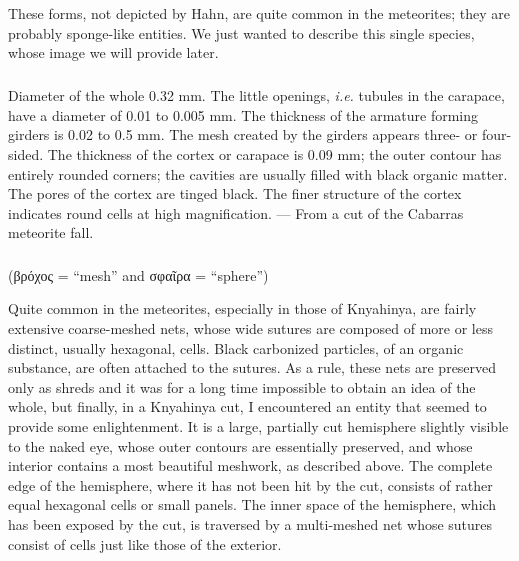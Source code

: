 \documentclass[a4paper, 12pt, oneside]{article}
\begin{document}
These forms, not depicted by Hahn, are quite common in the meteorites; they are probably sponge-like entities. We just wanted to describe this single species, whose image we will provide later.
\paragraph{\large{}}
\subparagraph{}
Diameter of the whole 0.32 mm. The little openings, \emph{i.e.} tubules in the carapace, have a diameter of 0.01 to 0.005 mm. The thickness of the armature forming girders is 0.02 to 0.5 mm. The mesh created by the girders appears three- or four-sided. The thickness of the cortex or carapace is 0.09 mm; the outer contour has entirely rounded corners; the cavities are usually filled with black organic matter. The pores of the cortex are tinged black. The finer structure of the cortex indicates round cells at high magnification. --- From a cut of the Cabarras meteorite fall.
\subsubsection{}
\paragraph*{}
(βρόχος = ``mesh'' and σφαῖρα = ``sphere'')%

Quite common in the meteorites, especially in those of Knyahinya, are fairly extensive coarse-meshed nets, whose wide sutures are composed of more or less distinct, usually hexagonal, cells. Black carbonized particles, of an organic substance, are often attached to the sutures. As a rule, these nets are preserved only as shreds and it was for a long time impossible to obtain an idea of the whole, but finally, in a Knyahinya cut, I encountered an entity that seemed to provide some enlightenment. It is a large, partially cut hemisphere slightly visible to the naked eye, whose outer contours are essentially preserved, and whose interior contains a most beautiful meshwork, as described above. The complete edge of the hemisphere, where it has not been hit by the cut, consists of rather equal hexagonal cells or small panels. The inner space of the hemisphere, which has been exposed by the cut, is traversed by a multi-meshed net whose sutures consist of cells just like those of the exterior.
\end{document}

